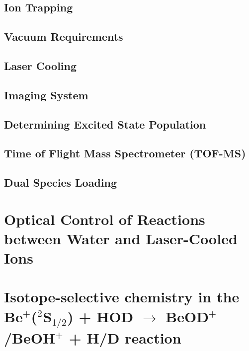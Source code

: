 \documentclass [PhD,nolistoftables,scheader] {uclathes}
\begin{document}
	\section{Ion Trapping}
	
	
	\section{Vacuum Requirements}
	
	
	\section{ Laser Cooling}
	
	
	\section{Imaging System}
	
	
	\section{Determining Excited State Population}
	

	\section{Time of Flight Mass Spectrometer (TOF-MS)} \label{sec: TOF}
	
	
	\section{Dual Species Loading} \label{sec: dual loading}
	

\chapter{Optical Control of Reactions between Water and Laser-Cooled  Ions} \label{sec: Be+H2O}
%	


\chapter{Isotope-selective chemistry in the Be$^+$($^2$S$_{1/2}$) + HOD $\rightarrow$ BeOD$^+$/BeOH$^+$ + H/D reaction}

\end{document}
